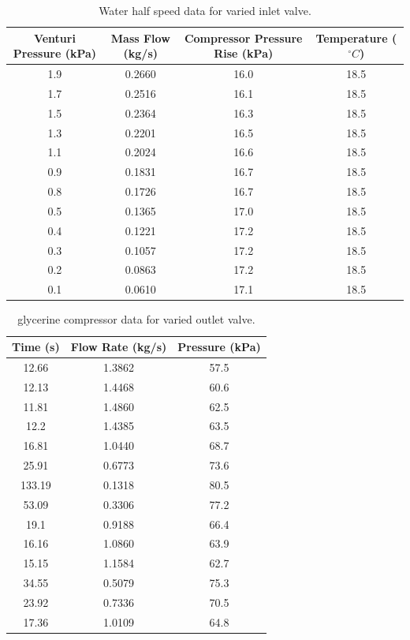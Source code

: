 \documentclass{article}
\begin{document}
\begin{table}[H]
    \centering
    \begin{tabular}{cccc}
        \hline
        Venturi Pressure (kPa) & Mass Flow (kg/s) & Compressor Pressure Rise (kPa) & Temperature ($^\circ C$)\\        \hline
        1.9 & 0.2660 & 16.0 & 18.5 \\
        1.7 & 0.2516 & 16.1 & 18.5 \\
        1.5 & 0.2364 & 16.3 & 18.5 \\
        1.3 & 0.2201 & 16.5 & 18.5 \\
        1.1 & 0.2024 & 16.6 & 18.5 \\
        0.9 & 0.1831 & 16.7 & 18.5 \\
        0.8 & 0.1726 & 16.7 & 18.5 \\
        0.5 & 0.1365 & 17.0 & 18.5 \\
        0.4 & 0.1221 & 17.2 & 18.5 \\
        0.3 & 0.1057 & 17.2 & 18.5 \\
        0.2 & 0.0863 & 17.2 & 18.5 \\
        0.1 & 0.0610 & 17.1 & 18.5 \\
        \hline
    \end{tabular}
    \caption{Water half speed data for varied inlet valve.}
    \label{tab:water_half_speed_inlet_data}
\end{table}


\begin{table}[H]
    \centering
    \begin{tabular}{ccc}
        \hline
        Time (s)& Flow Rate (kg/s) & Pressure (kPa) \\
        \hline
        12.66 & 1.3862 & 57.5 \\
        12.13 & 1.4468 & 60.6 \\
        11.81 & 1.4860 & 62.5 \\
        12.2  & 1.4385  & 63.5 \\
        16.81 & 1.0440 & 68.7 \\
        25.91 & 0.6773 & 73.6 \\
        133.19 & 0.1318 & 80.5 \\
        53.09 & 0.3306 & 77.2 \\
        19.1  & 0.9188 & 66.4 \\
        16.16 & 1.0860 & 63.9 \\
        15.15 & 1.1584 & 62.7 \\
        34.55 & 0.5079 & 75.3 \\
        23.92 & 0.7336 & 70.5 \\
        17.36 & 1.0109   & 64.8 \\
        \hline
    \end{tabular}
    \caption{glycerine compressor data for varied outlet valve.}
    \label{tab:glycerine_outlet_data}
\end{table}
\end{document}

